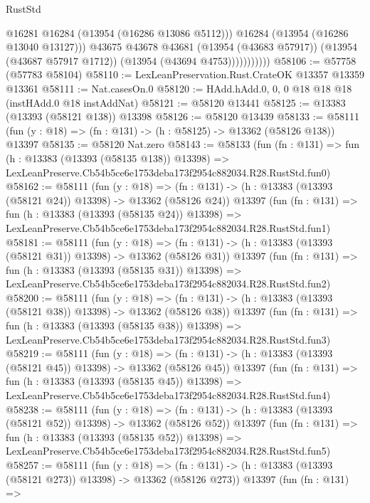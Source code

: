 \begin{lexlean}{RustStd}
\begin{coremodule}
                          @16281
                          @16284
                          (@13954 (@16286 @13086 @5112)))
                        @16284
                        (@13954 (@16286 @13040 @13127)))
                      @43675
                      @43678
                      @43681
                      (@13954 (@43683 @57917))
                      (@13954 (@43687 @57917 @1712))
                      (@13954 (@43694 @4753)))))))))))
@58106 := @57758 (@57783 @58104)
@58110 := LexLeanPreservation.Rust.CrateOK @13357 @13359 @13361
@58111 := Nat.casesOn.{0}
@58120 := HAdd.hAdd.{0, 0, 0} @18 @18 @18 (instHAdd.{0} @18 instAddNat)
@58121 := @58120 @13441
@58125 := @13383 (@13393 (@58121 @138)) @13398
@58126 := @58120 @13439
@58133 := @58111 (fun (y : @18) => (fn : @131) -> (h : @58125) -> @13362 (@58126 @138)) @13397
@58135 := @58120 Nat.zero
@58143 := @58133
    (fun (fn : @131) =>
    fun (h : @13383 (@13393 (@58135 @138)) @13398) =>
    LexLeanPreserve.Cb54b5ce6e1753deba173f2954c882034.R28.RustStd.fun0)
@58162 := @58111
    (fun (y : @18) =>
    (fn : @131) -> (h : @13383 (@13393 (@58121 @24)) @13398) -> @13362 (@58126 @24))
    @13397
    (fun (fn : @131) =>
    fun (h : @13383 (@13393 (@58135 @24)) @13398) =>
    LexLeanPreserve.Cb54b5ce6e1753deba173f2954c882034.R28.RustStd.fun1)
@58181 := @58111
    (fun (y : @18) =>
    (fn : @131) -> (h : @13383 (@13393 (@58121 @31)) @13398) -> @13362 (@58126 @31))
    @13397
    (fun (fn : @131) =>
    fun (h : @13383 (@13393 (@58135 @31)) @13398) =>
    LexLeanPreserve.Cb54b5ce6e1753deba173f2954c882034.R28.RustStd.fun2)
@58200 := @58111
    (fun (y : @18) =>
    (fn : @131) -> (h : @13383 (@13393 (@58121 @38)) @13398) -> @13362 (@58126 @38))
    @13397
    (fun (fn : @131) =>
    fun (h : @13383 (@13393 (@58135 @38)) @13398) =>
    LexLeanPreserve.Cb54b5ce6e1753deba173f2954c882034.R28.RustStd.fun3)
@58219 := @58111
    (fun (y : @18) =>
    (fn : @131) -> (h : @13383 (@13393 (@58121 @45)) @13398) -> @13362 (@58126 @45))
    @13397
    (fun (fn : @131) =>
    fun (h : @13383 (@13393 (@58135 @45)) @13398) =>
    LexLeanPreserve.Cb54b5ce6e1753deba173f2954c882034.R28.RustStd.fun4)
@58238 := @58111
    (fun (y : @18) =>
    (fn : @131) -> (h : @13383 (@13393 (@58121 @52)) @13398) -> @13362 (@58126 @52))
    @13397
    (fun (fn : @131) =>
    fun (h : @13383 (@13393 (@58135 @52)) @13398) =>
    LexLeanPreserve.Cb54b5ce6e1753deba173f2954c882034.R28.RustStd.fun5)
@58257 := @58111
    (fun (y : @18) =>
    (fn : @131) -> (h : @13383 (@13393 (@58121 @273)) @13398) -> @13362 (@58126 @273))
    @13397
    (fun (fn : @131) =>

\end{coremodule}
\end{lexlean}
